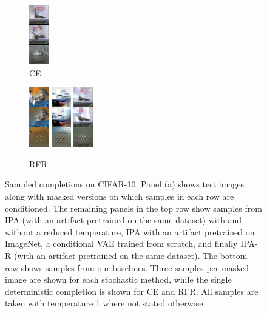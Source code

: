 \begin{figure}[t]
\begin{subfigure}[t]{0.08\textwidth}
      \includegraphics[height=\cifarimgheight]{figs/cigcvae/image-samples/cifar10/freeform_ce_3_samples}
      \caption{CE}
    \end{subfigure}
    \begin{subfigure}[t]{0.08\textwidth}
      \centering
      \includegraphics[height=\cifarimgheight]{figs/cigcvae/image-samples/cifar10/freeform_rfr_0_samples}
      \includegraphics[height=\cifarimgheight]{figs/cigcvae/image-samples/cifar10/freeform_rfr_1_samples}
      \includegraphics[height=\cifarimgheight]{figs/cigcvae/image-samples/cifar10/freeform_rfr_3_samples}
      \caption{RFR}
    \end{subfigure}
    \caption{Sampled completions on CIFAR-10. Panel (a) shows test images along
      with masked versions on which samples in each row are conditioned. The
      remaining panels in the top row show samples from IPA (with an artifact
      pretrained on the same dataset) with and without a reduced temperature,
      IPA with an artifact pretrained on ImageNet, a conditional VAE trained
      from scratch, and finally IPA-R (with an artifact pretrained on the same
      dataset). The bottom row shows samples from our baselines. Three samples
      per masked image are shown for each stochastic method, while the single
      deterministic completion is shown for CE and RFR. All samples are taken
      with temperature 1 where not stated otherwise.}
    \label{fig:cigcvae-cifar-samples-0}
  \end{figure}


